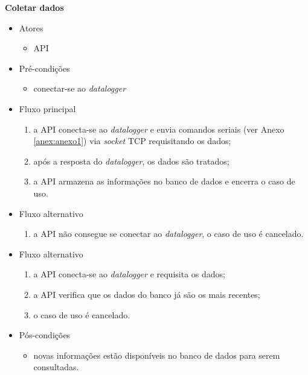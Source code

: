 
\textbf{Coletar dados}

\begin{itemize}
    \item Atores
    \begin{itemize}
        \item API
    \end{itemize}

    \item Pré-condições
    \begin{itemize}
        \item conectar-se ao \textit{datalogger}
    \end{itemize}

    \item Fluxo principal
    \begin{enumerate}
        \item a API conecta-se ao \textit{datalogger} e envia comandos seriais (ver Anexo \ref{anex:anexo1}) via \textit{socket} TCP requisitando os dados;
        \item após a resposta do \textit{datalogger}, os dados são tratados;
        \item a API armazena as informações no banco de dados e encerra o caso de uso.
    \end{enumerate}
    
    \item Fluxo alternativo
    \begin{enumerate}
        \item a API não consegue se conectar ao \textit{datalogger}, o caso de uso é cancelado.
    \end{enumerate}
	
	\item Fluxo alternativo
    \begin{enumerate}
        \item a API conecta-se ao \textit{datalogger} e requisita os dados;
        \item a API verifica que os dados do banco já são os mais recentes;
        \item o caso de uso é cancelado.
    \end{enumerate}

    \item Pós-condições
    \begin{itemize}
       \item novas informações estão disponíveis no banco de dados para serem consultadas.
    \end{itemize}
\end{itemize}

